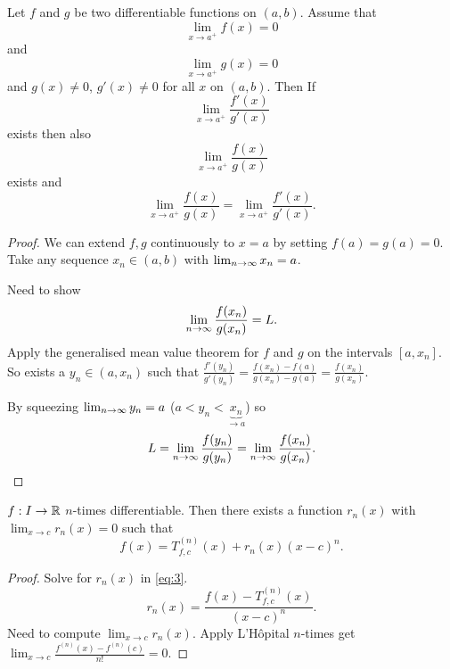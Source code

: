 \begin{theorem}\label{thm:lhopital}
    Let $f$ and $g$ be two differentiable functions on $(a, b)$.
    Assume that
    \[
    \lim_{x \to a ^ {+}}f(x) = 0
    \]
    and
    \[
    \lim_{x \to a ^ {+}}g(x) = 0
    \]
    and $g(x) \neq 0$,
    $g'(x) \neq 0$ for all $x$ on $(a, b)$.
    Then
    If
    \[
    \lim_{x \to a ^ {+}}\frac{f'(x)}{g'(x)}
    \]
    exists then also
    \[
    \lim_{x \to a ^ {+}}\frac{f(x)}{g(x)}
    \]
    exists
    and
    \[
    \lim_{x \to a ^ {+}}\frac{f(x)}{g(x)} = \lim_{x \to a ^ {+}}\frac{f'(x)}{g'(x)}.
    \]
\end{theorem}
\begin{proof}
    We can extend $f, g$ continuously to $x = a$ by setting $f(a) = g(a) = 0$.
    Take any  sequence $x_n \in (a, b)$ with $\lim_{n \rightarrow \infty} x_n = a$.

    Need to show
    \[
    \lim_{n \rightarrow \infty} \frac{f(x_n)}{g(x_n)} = L.
    \]
    Apply the generalised mean value theorem for $f$ and $g$ on the intervals $[a, x_n]$.
    So exists a $y_n \in (a, x_n)$ such that $\frac{f'(y_n)}{g'(y_n)} = \frac{f(x_n) - f(a)}{g(x_n) - g(a)} = \frac{f(x_n)}{g(x_n)}$.

    By squeezing $\lim_{n \rightarrow \infty} y_n = a$
    ($a < y_n < \underbrace{x_n}_{\to a}$)
    so
    \[
    L = \lim_{n \rightarrow \infty}\frac{f(y_n)}{g(y_n)} = \lim_{n \rightarrow \infty}\frac{f(x_n)}{g(x_n)}.
    \]
\end{proof}

\begin{theorem}\label{thm:taylors_peano}
    $f : I \to \mathbb{R}$ $n$-times differentiable.
    Then there exists a function $r_n(x)$ with $\lim_{x \to c}r_n(x) = 0$ such that
    \begin{equation}\label{eq:3}
        f(x) = T_{f, c} ^ {(n)}(x) + r_n(x)(x - c) ^ n.
    \end{equation}
\end{theorem}
\begin{proof}
    Solve for $r_n(x)$ in \eqref{eq:3}.
    \[
    r_n(x) = \frac{f(x) - T_{f, c} ^{(n)}(x)}{(x - c) ^ n}.
    \]
    Need to compute $\lim_{x \to c}r_n(x)$.
    Apply L'H\^opital $n$-times get $\lim_{x \to c}\frac{f ^ {(n)}(x) - f ^ {(n)}(c)}{n!} = 0$.
\end{proof}

